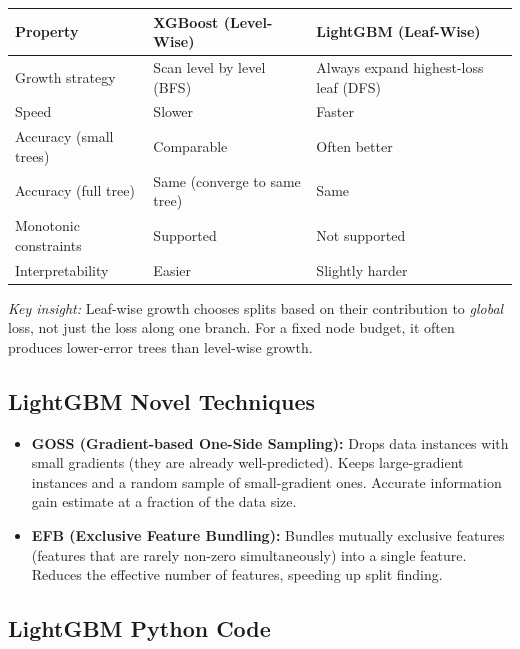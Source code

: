 \documentclass[11pt]{article}
\begin{document}
\begin{center}
\begin{tabular}{@{}lll@{}}
\toprule
\textbf{Property}       & \textbf{XGBoost (Level-Wise)} & \textbf{LightGBM (Leaf-Wise)} \\
\midrule
Growth strategy         & Scan level by level (BFS)     & Always expand highest-loss leaf (DFS) \\
Speed                   & Slower                        & Faster                                 \\
Accuracy (small trees)  & Comparable                    & Often better                           \\
Accuracy (full tree)    & Same (converge to same tree)  & Same                                   \\
Monotonic constraints   & Supported                     & Not supported                          \\
Interpretability        & Easier                        & Slightly harder                        \\
\bottomrule
\end{tabular}
\end{center}

\textit{Key insight:} Leaf-wise growth chooses splits based on their contribution to
\emph{global} loss, not just the loss along one branch. For a fixed node budget, it
often produces lower-error trees than level-wise growth.

\subsection{LightGBM Novel Techniques}
\begin{itemize}
    \item \textbf{GOSS (Gradient-based One-Side Sampling):} Drops data instances
      with small gradients (they are already well-predicted). Keeps large-gradient
      instances and a random sample of small-gradient ones. Accurate information
      gain estimate at a fraction of the data size.
    \item \textbf{EFB (Exclusive Feature Bundling):} Bundles mutually exclusive
      features (features that are rarely non-zero simultaneously) into a single
      feature. Reduces the effective number of features, speeding up split finding.
\end{itemize}

\subsection{LightGBM Python Code}
\end{document}
